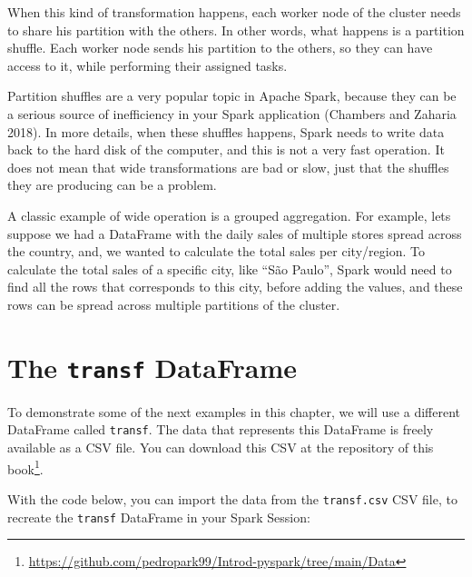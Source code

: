 \documentclass[
  11pt,
  letterpaper,
  DIV=11,
  numbers=noendperiod]{scrreprt}
\begin{document}
When this kind of transformation happens, each worker node of the
cluster needs to share his partition with the others. In other words,
what happens is a partition shuffle. Each worker node sends his
partition to the others, so they can have access to it, while performing
their assigned tasks.

Partition shuffles are a very popular topic in Apache Spark, because
they can be a serious source of inefficiency in your Spark application
(Chambers and Zaharia 2018). In more details, when these shuffles
happens, Spark needs to write data back to the hard disk of the
computer, and this is not a very fast operation. It does not mean that
wide transformations are bad or slow, just that the shuffles they are
producing can be a problem.

A classic example of wide operation is a grouped aggregation. For
example, lets suppose we had a DataFrame with the daily sales of
multiple stores spread across the country, and, we wanted to calculate
the total sales per city/region. To calculate the total sales of a
specific city, like ``São Paulo'', Spark would need to find all the rows
that corresponds to this city, before adding the values, and these rows
can be spread across multiple partitions of the cluster.

\hypertarget{sec-transf-dataframe}{%
\section{\texorpdfstring{The \texttt{transf}
DataFrame}{The transf DataFrame}}\label{sec-transf-dataframe}}

To demonstrate some of the next examples in this chapter, we will use a
different DataFrame called \texttt{transf}. The data that represents
this DataFrame is freely available as a CSV file. You can download this
CSV at the repository of this book\footnote{\url{https://github.com/pedropark99/Introd-pyspark/tree/main/Data}}.

With the code below, you can import the data from the
\texttt{transf.csv} CSV file, to recreate the \texttt{transf} DataFrame
in your Spark Session:
\end{document}
